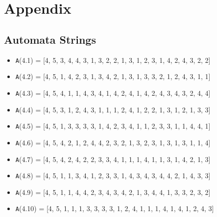 \documentclass[runningheads, a4paper]{llncs}
\begin{document}
\section{Appendix}

\subsection{Automata Strings}


\begin{itemize}
	\item {\texttt A(4.1) = } [4, 5, 3, 4, 4, 3, 1, 3, 2, 2, 1, 3, 1, 2, 3, 1, 4, 2, 4, 3, 2, 2]
	\item {\texttt A(4.2) = } [4, 5, 1, 4, 2, 3, 1, 3, 4, 2, 1, 3, 1, 3, 3, 2, 1, 2, 4, 3, 1, 1]
	\item {\texttt A(4.3) = } [4, 5, 4, 1, 1, 4, 3, 4, 1, 4, 2, 4, 1, 4, 2, 4, 3, 4, 3, 2, 4, 4]
	\item {\texttt A(4.4) = } [4, 5, 3, 1, 2, 4, 3, 1, 1, 1, 2, 4, 1, 2, 2, 1, 3, 1, 2, 1, 3, 3]
	\item {\texttt A(4.5) = } [4, 5, 1, 3, 3, 3, 3, 1, 4, 2, 3, 4, 1, 1, 2, 3, 3, 1, 1, 4, 4, 1]
	
	\item {\texttt A(4.6) = } [4, 5, 4, 2, 1, 2, 4, 4, 2, 3, 2, 1, 3, 2, 3, 1, 3, 1, 3, 1, 1, 4]
	\item {\texttt A(4.7) = } [4, 5, 4, 2, 4, 2, 2, 3, 3, 4, 1, 1, 1, 4, 1, 1, 3, 1, 4, 2, 1, 3]
	\item {\texttt A(4.8) = } [4, 5, 1, 1, 3, 4, 1, 2, 3, 3, 1, 4, 3, 4, 3, 4, 4, 2, 1, 4, 3, 3]
	\item {\texttt A(4.9) = } [4, 5, 1, 1, 4, 4, 2, 3, 4, 3, 4, 2, 1, 3, 4, 4, 1, 3, 3, 2, 3, 2]
	\item {\texttt A(4.10) = } [4, 5, 1, 1, 1, 3, 3, 3, 3, 1, 2, 4, 1, 1, 1, 4, 1, 4, 1, 2, 4, 3]	
\end{itemize}
\end{document}
